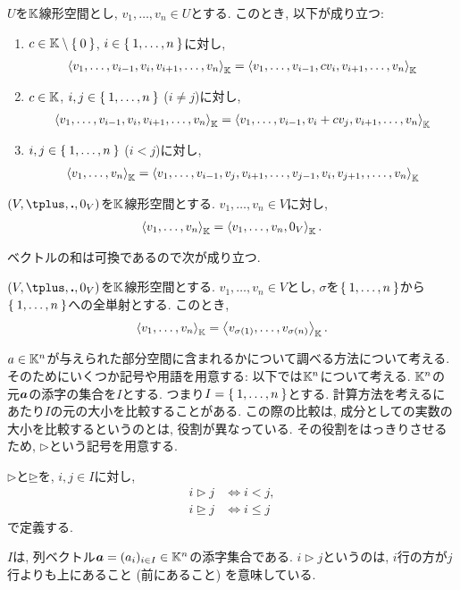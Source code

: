 \begin{lemma}
  $U$を$\mathbb{K}$線形空間とし,
  $v_1,\ldots,v_n\in U$とする.
  このとき, 以下が成り立つ:
  \begin{enumerate}
  \item
    $c\in \mathbb{K}\setminus\Set{0}$, $i\in\Set{1,\ldots,n}$に対し,
    \begin{align*}
      \Braket{v_1,\ldots,v_{i-1},v_{i},v_{i+1},\ldots,v_n}_{\mathbb{K}}=
      \Braket{v_1,\ldots,v_{i-1},cv_{i},v_{i+1},\ldots,v_n}_{\mathbb{K}}
    \end{align*}
  \item
    $c\in \mathbb{K}$, $i,j\in\Set{1,\ldots,n}$ ($i\neq j$)に対し,
    \begin{align*}
      \Braket{v_1,\ldots,v_{i-1},v_{i},v_{i+1},\ldots,v_n}_{\mathbb{K}}=
      \Braket{v_1,\ldots,v_{i-1},v_i+cv_{j},v_{i+1},\ldots,v_n}_{\mathbb{K}}
    \end{align*}
  \item
    $i,j\in\Set{1,\ldots,n}$ ($i< j$)に対し,
    \begin{align*}
      \Braket{v_1,\ldots,v_n}_{\mathbb{K}}=
      \Braket{v_1,\ldots,v_{i-1},v_j,v_{i+1},\ldots,v_{j-1},v_i,v_{j+1},,\ldots,v_n}_{\mathbb{K}}
    \end{align*}
  \end{enumerate}
\end{lemma}

\begin{lemma}
  $(V,\plus,\act,0_V)$を$\mathbb{K}$線形空間とする.
  $v_1,\ldots,v_n\in V$に対し,
    \begin{align*}
      \Braket{v_1,\ldots,v_n}_{\mathbb{K}}=
      \Braket{v_1,\ldots,v_n,0_V}_{\mathbb{K}}.
    \end{align*}
\end{lemma}

ベクトルの和は可換であるので次が成り立つ.
\begin{lemma}
  $(V,\plus,\act,0_V)$を$\mathbb{K}$線形空間とする.
  $v_1,\ldots,v_n\in V$とし,
  $\sigma$を$\Set{1,\ldots,n}$から$\Set{1,\ldots,n}$への全単射とする.
  このとき,
    \begin{align*}
      \Braket{v_1,\ldots,v_n}_{\mathbb{K}}=
      \Braket{v_{\sigma(1)},\ldots,v_{\sigma(n)}}_{\mathbb{K}}.
    \end{align*}
\end{lemma}


$a\in\mathbb{K}^n$が与えられた部分空間に含まれるかについて調べる方法について考える.
そのためにいくつか記号や用語を用意する:
以下では$\mathbb{K}^n$について考える.
$\mathbb{K}^n$の元$\boldsymbol{a}$の添字の集合を$I$とする.
つまり$I=\Set{1,\ldots,n}$とする.
計算方法を考えるにあたり$I$の元の大小を比較することがある.
この際の比較は, 成分としての実数の大小を比較するというのとは,
役割が異なっている.
その役割をはっきりさせるため, $\rhd$という記号を用意する.
\begin{definition}
  $\rhd$と$\unrhd$を,
  $i,j\in I$に対し,
  \begin{align*}
    i\rhd j &\iff i < j,\\
    i\unrhd j &\iff i \leq j
  \end{align*}
  で定義する.
\end{definition}
$I$は, 列ベクトル$\boldsymbol{a}=(a_i)_{i\in I} \in \mathbb{K}^n$の添字集合である.
$i\rhd j$というのは,
$i$行の方が$j$行よりも上にあること (前にあること) を意味している.

